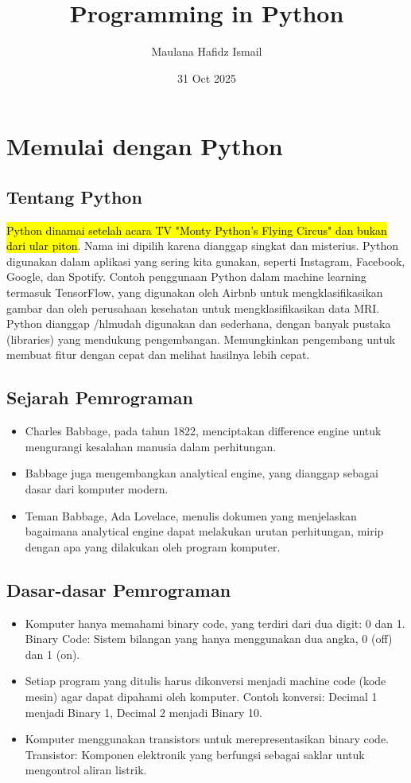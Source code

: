 \documentclass{article}
\title{Programming in Python}
\date{31 Oct 2025}
\author{Maulana Hafidz Ismail}
\begin{document}
\maketitle
\newpage

\tableofcontents
\newpage
{}

\section{Memulai dengan Python}
\subsection{Tentang Python}
\hl{Python dinamai setelah acara TV "Monty Python's Flying Circus" dan bukan dari ular piton}. Nama ini dipilih karena dianggap singkat dan misterius. Python digunakan dalam aplikasi yang sering kita gunakan, seperti Instagram, Facebook, Google, dan Spotify. Contoh penggunaan Python dalam machine learning termasuk TensorFlow, yang digunakan oleh Airbnb untuk mengklasifikasikan gambar dan oleh perusahaan kesehatan untuk mengklasifikasikan data MRI. Python dianggap /hl{mudah digunakan dan sederhana}, dengan banyak pustaka (libraries) yang mendukung pengembangan. Memungkinkan pengembang untuk membuat fitur dengan cepat dan melihat hasilnya lebih cepat.

\subsection{Sejarah Pemrograman}
\begin{itemize}
    \item Charles Babbage, pada tahun 1822, menciptakan difference engine untuk mengurangi kesalahan manusia dalam perhitungan.
    \item Babbage juga mengembangkan analytical engine, yang dianggap sebagai dasar dari komputer modern.
    \item Teman Babbage, Ada Lovelace, menulis dokumen yang menjelaskan bagaimana analytical engine dapat melakukan urutan perhitungan, mirip dengan apa yang dilakukan oleh program komputer.
\end{itemize}

\subsection{Dasar-dasar Pemrograman}
\begin{itemize}
    \item Komputer hanya memahami binary code, yang terdiri dari dua digit: 0 dan 1. Binary Code: Sistem bilangan yang hanya menggunakan dua angka, 0 (off) dan 1 (on).
    \item Setiap program yang ditulis harus dikonversi menjadi machine code (kode mesin) agar dapat dipahami oleh komputer. Contoh konversi: Decimal 1 menjadi Binary 1, Decimal 2 menjadi Binary 10.
    \item Komputer menggunakan transistors untuk merepresentasikan binary code. Transistor: Komponen elektronik yang berfungsi sebagai saklar untuk mengontrol aliran listrik.
\end{itemize}
\end{document}
